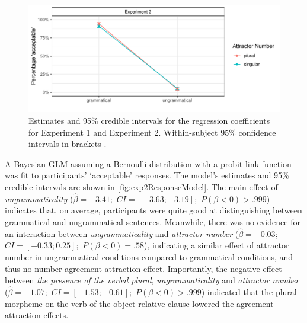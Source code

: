 \documentclass[doc,a4paper,man,natbib,floatsintext,noextraspace]{apa6}\usepackage[]{graphicx}\usepackage[]{color}
\makeatletter
\def\maxwidth{ %
  \ifdim\Gin@nat@width>\linewidth
    \linewidth
  \else
    \Gin@nat@width
  \fi
}
\newenvironment{knitrout}{}{} %
\makeatother
\begin{document}
\begin{knitrout}
\color{fgcolor}\begin{figure}

{\centering \includegraphics[width=\maxwidth]{figure/exp2AvgResponse-1} 

}

\caption{Estimates and 95\% credible intervals for the regression coefficients for Experiment 1 and Experiment 2.  Within-subject 95\% confidence intervals in brackets \cite{Cousineau:2005,Morey:2008}.}\label{fig:exp2AvgResponse}
\end{figure}


\end{knitrout}







A Bayesian GLM assuming a Bernoulli distribution with a probit-link function was fit to participants' `acceptable' responses. The model's estimates and 95\% credible intervals are shown in \autoref{fig:exp2ResponseModel}. 
The main effect of \textit{ungrammaticality} ($\hat{\beta}=-3.41;$ $CI=[-3.63; -3.19];$ $P(\beta<0)> .999$) indicates that, 
on average, participants were quite good at distinguishing between grammatical and ungrammatical sentences. 
Meanwhile, there was no evidence for an interaction between \textit{ungrammaticality} and \textit{attractor number} ($\hat{\beta}=-0.03;$ $CI=[-0.33; 0.25];$ $P(\beta<0)=    .58$), indicating 
a similar effect of attractor number in ungrammatical conditions compared to grammatical conditions, and thus no number agreement attraction effect.
Importantly, the negative effect between \textit{the presence of the verbal plural}, \textit{ungrammaticality} and \textit{attractor number} ($\hat{\beta}=-1.07;$ $CI=[-1.53; -0.61];$ $P(\beta<0)> .999$) indicated that the plural morpheme on the verb of the object relative clause lowered the agreement attraction effects.
\end{document}
